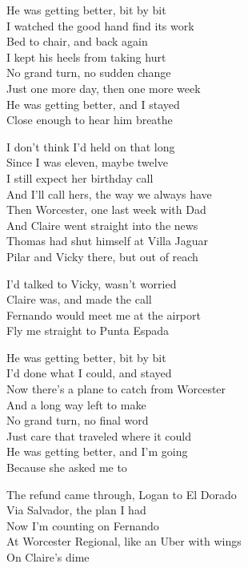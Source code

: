 \begin{lyrics}
He was getting better, bit by bit\\
I watched the good hand find its work\\
Bed to chair, and back again\\
I kept his heels from taking hurt\\
No grand turn, no sudden change\\
Just one more day, then one more week\\
He was getting better, and I stayed\\
Close enough to hear him breathe

I don’t think I’d held on that long\\
Since I was eleven, maybe twelve\\
I still expect her birthday call\\
And I’ll call hers, the way we always have\\
Then Worcester, one last week with Dad\\
And Claire went straight into the news\\
Thomas had shut himself at Villa Jaguar\\
Pilar and Vicky there, but out of reach

I’d talked to Vicky, wasn’t worried\\
Claire was, and made the call\\
Fernando would meet me at the airport\\
Fly me straight to Punta Espada

He was getting better, bit by bit\\
I’d done what I could, and stayed\\
Now there’s a plane to catch from Worcester\\
And a long way left to make\\
No grand turn, no final word\\
Just care that traveled where it could\\
He was getting better, and I’m going\\
Because she asked me to

The refund came through, Logan to El Dorado\\
Via Salvador, the plan I had\\
Now I’m counting on Fernando\\
At Worcester Regional, like an Uber with wings\\
On Claire’s dime
\end{lyrics}

